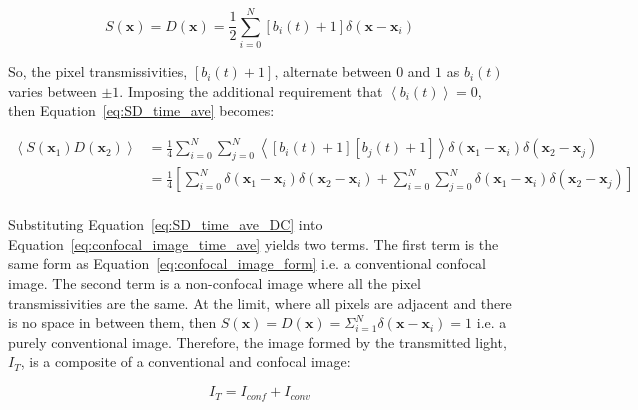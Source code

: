 \begin{equation}\label{eq:detector_aperture_time_DC}
S\left(\textbf{x}\right) = D\left(\textbf{x}\right) = \frac{1}{2} \sum_{i=0}^{N} \left[b_{i}\left(t\right) + 1\right]\delta\left(\textbf{x} - \textbf{x}_{i}\right)
\end{equation} 

So, the pixel transmissivities, $\left[b_{i}\left(t\right) + 
1\right]$, alternate between $0$ and $1$ as $b_{i}\left(t\right)$ 
varies between $\pm1$. Imposing the additional requirement that 
$\left\langle b_{i}\left(t\right) \right\rangle = 0$, then 
Equation~\ref{eq:SD_time_ave} becomes:

\begin{equation}\label{eq:SD_time_ave_DC}
\begin{split}
\left\langle S\left(\textbf{x}_{1}\right) D\left(\textbf{x}_{2}\right)\right\rangle &= \frac{1}{4} \sum_{i=0}^{N}\sum_{j=0}^{N} \left\langle \left[b_{i}\left(t\right) + 1\right] \left[b_{j}\left(t\right) + 1\right] \right\rangle \delta\left(\textbf{x}_{1} - \textbf{x}_{i}\right) \delta\left(\textbf{x}_{2} - \textbf{x}_{j}\right)\\
&= \frac{1}{4} \left[\sum_{i=0}^{N} \delta\left(\textbf{x}_{1} - \textbf{x}_{i}\right) \delta\left(\textbf{x}_{2} - \textbf{x}_{i}\right) + \sum_{i=0}^{N}\sum_{j=0}^{N} \delta\left(\textbf{x}_{1} - \textbf{x}_{i}\right) \delta\left(\textbf{x}_{2} - \textbf{x}_{j}\right)\right]\\
\end{split}
\end{equation}

Substituting Equation~\ref{eq:SD_time_ave_DC} into Equation~\ref{eq:confocal_image_time_ave} 
yields two terms. The first term is the same form as 
Equation~\ref{eq:confocal_image_form} i.e. a conventional 
confocal image. The second term is a non-confocal image 
where all the pixel transmissivities are the same. At the 
limit, where all pixels are adjacent and there is no space 
in between them, then $S\left(\textbf{x}\right) = 
D\left(\textbf{x}\right) = \Sigma_{i=1}^{N}\delta\left(
\textbf{x} - \textbf{x}_{i}\right) = 1$ i.e. a purely 
conventional image\cite{juskaitis1996efficient,wilson1996confocal}. 
Therefore, the image formed by the transmitted light, $I_{T}$, 
is a composite of a conventional and confocal image:

\begin{equation}\label{eq:transmitted_image}
I_{T} = I_{conf} + I_{conv}
\end{equation}

